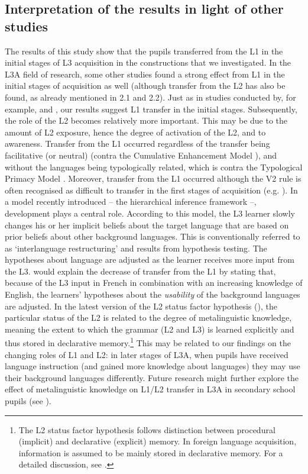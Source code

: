 \documentclass[output=paper,modfonts,nonflat, newtxmath]{langsci/langscibook}
\begin{document}
\subsection{{Interpretation} {of} {the} {results} {in} {light} {of} {other} {studies} }%
\label{sec:stadt:5.2}
The results of this study show that the pupils transferred from the L1 in the initial stages of L3 acquisition in the constructions that we investigated. In the L3A field of research, some other studies found a strong effect from L1 in the initial stages of acquisition as well (although transfer from the L2 has also be found, as already mentioned in 2.1 and 2.2). Just as in studies conducted by, for example, \citet{NaRanongLeung2009} and \citet{Hermas2010, Hermas2014Morphosyntax, Hermas2014Relatives}, our results suggest L1 transfer in the initial stages. Subsequently, the role of the L2 becomes relatively more important. This may be due to the amount of L2 exposure, hence the degree of activation of the L2, and to awareness.
Transfer from the L1 occurred regardless of the transfer being facilitative (or neutral) (contra the Cumulative Enhancement Model \citealt{FlynnEtAl2004}), and without the languages being typologically related, which is contra the Typological Primacy Model \citep{Rothman2010, Rothman2011, Rothman2015}. Moreover, transfer from the L1 occurred although the V2 rule is often recognised as difficult to transfer in the first stages of acquisition (e.g. \citealt{Pienemann1998}). In a model recently introduced – the hierarchical inference framework \citep{PajakEtAl2016} –, development plays a central role. According to this model, the L3 learner slowly changes his or her implicit beliefs about the target language that are based on prior beliefs about other background languages. This is conventionally referred to as ‘interlanguage restructuring’ and results from hypothesis testing. The hypotheses about language are adjusted as the learner receives more input from the L3. \citet{PajakEtAl2016} would explain the decrease of transfer from the L1 by stating that, because of the L3 input in French in combination with an increasing knowledge of English, the learners’ hypotheses about the \textit{usability} of the background languages are adjusted.
In the latest version of the L2 status factor hypothesis (\citealt{BardelSánchez2017}), the particular status of the L2 is related to the degree of metalinguistic knowledge, meaning the extent to which the grammar (L2 and L3) is learned explicitly and thus stored in declarative memory.\footnote{The L2 status factor hypothesis follows  distinction between procedural (implicit) and declarative (explicit) memory. In foreign language acquisition, information is assumed to be mainly stored in declarative memory. For a detailed discussion, see \citet{BardelSánchez2017}.} This may be related to our findings on the changing roles of L1 and L2: in later stages of L3A, when pupils have received language instruction (and gained more knowledge about languages) they may use their background languages differently. Future research might further explore the effect of metalinguistic knowledge on L1/L2 transfer in L3A in secondary school pupils (see \citealt{FalkEtAl2015}).
\end{document}
